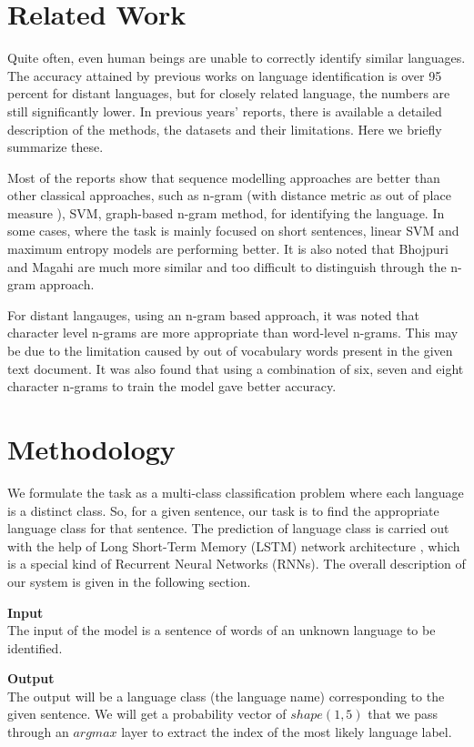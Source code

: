 \documentclass[11pt]{article}
\begin{document}
\section{Related Work}

Quite often, even human beings are unable to correctly identify similar languages. The accuracy attained by previous works on language identification is over 95 percent for distant languages, but for closely related language, the numbers are still significantly lower. In previous years' reports, there is available a detailed description of the methods, the datasets and their limitations. Here we briefly summarize these.

Most of the reports show that sequence modelling approaches are better than other classical approaches, such as n-gram (with distance metric as out of place measure \cite{singh2014language} ), SVM, graph-based n-gram method, for identifying the language. In some cases, where the task is mainly focused on short sentences, linear SVM and maximum entropy models are performing better. It is also noted that Bhojpuri and Magahi are much more similar and too difficult to distinguish through the n-gram approach.

For distant langauges, using an n-gram based approach, it was noted that character level n-grams are more appropriate than word-level n-grams. This may be due to the limitation caused by out of vocabulary words present in the given text document. It was also found that using a combination of six, seven and eight character n-grams to train the model gave better accuracy.

\section{Methodology}

We formulate the task as a multi-class classification problem where each language is a distinct class. So, for a given sentence, our task is to find the appropriate language class for that sentence. The prediction of language class is carried out with the help of Long Short-Term Memory (LSTM) network architecture \cite{gonzalez2014automatic}, which is a special kind of Recurrent Neural Networks (RNNs). The overall description of our system is given in the following section.

\noindent \textbf{Input}
 ~\\
 The input of the model is a sentence of words of an unknown language to be identified.
 
\noindent \textbf{Output}
 ~\\
The output will be a language class (the language name) corresponding to the given sentence. We will get a probability vector of $shape(1,5)$ that we pass through an $argmax$ layer to extract the index of the most likely language label.
\end{document}
